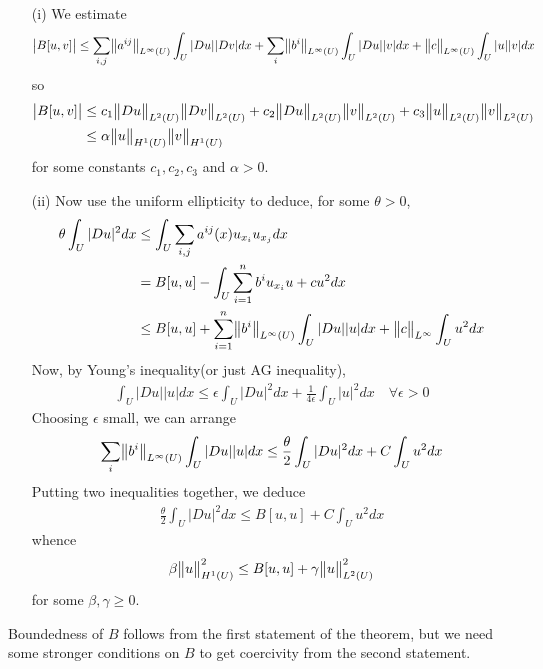 \documentclass[12pt,a4paper]{report}
\newenvironment{proof}
{\begin{changemargin}{1cm}{0.5cm} 
	}%
	{\end{changemargin}
}
\begin{document}
\begin{proof}
\pf \begin{itemize}
\item[(i)] We estimate
\begin{align*}
\big| B[u,v]\big| \leq \sum_{i,j} \bigl\lVert a^{ij}\bigr\rVert_{L^{\infty}(U)} \int_U |Du||Dv| dx + \sum_{i} \bigl\lVert b^i\bigr\rVert_{L^{\infty}(U)} \int_U |Du||v| dx + \bigl\lVert c\bigr\rVert_{L^{\infty}(U)} \int_U |u||v| dx
\end{align*}
so
\begin{align*}
\big| B[u,v]\big| &\leq c_1 \bigl\lVert Du\bigr\rVert_{L^2(U)} \bigl\lVert Dv\bigr\rVert_{L^2(U)} + c_2 \bigl\lVert Du\bigr\rVert_{L^2(U)} \bigl\lVert v\bigr\rVert_{L^2(U)} + c_3 \bigl\lVert u\bigr\rVert_{L^2(U)} \bigl\lVert v\bigr\rVert_{L^2(U)} \\
&\leq \alpha \bigl\lVert u\bigr\rVert_{H^1(U)} \bigl\lVert v\bigr\rVert_{H^1(U)}
\end{align*}
for some constants $c_1,c_2,c_3$ and $\alpha>0$.
\item[(ii)] Now use the uniform ellipticity to deduce, for some $\theta >0$,
\begin{align*}
\theta \int_U |Du|^2 dx &\leq \int_U \sum_{i,j} a^{ij}(x) u_{x_i} u_{x_j} dx \\
&= B[u,u] - \int_U \sum_{i=1}^n b^i u_{x_i} u + cu^2 dx \\
&\leq B[u,u] + \sum_{i=1}^n \bigl\lVert b^i\bigr\rVert_{L^{\infty}(U)} \int_U |Du||u| dx + \bigl\lVert c\bigr\rVert_{L^{\infty}} \int_U u^2 dx
\end{align*}
Now, by Young's inequality(or just AG inequality),
\begin{align*}
\int_U |Du||u| dx \leq \epsilon \int_U |Du|^2 dx + \frac{1}{4\epsilon} \int_U |u|^2 dx \quad \forall \epsilon>0
\end{align*}
Choosing $\epsilon$ small, we can arrange
\begin{align*}
\sum_i \bigl\lVert b^i\bigr\rVert_{L^{\infty}(U)} \int_U |Du||u| dx \leq \frac{\theta}{2} \int_U |Du|^2 dx + C \int_U u^2 dx
\end{align*}
Putting two inequalities together, we deduce
\begin{align*}
\frac{\theta}{2} \int_U |Du|^2 dx \leq B[u,u] + C \int_U u^2 dx
\end{align*}
whence
\begin{align*}
\beta \bigl\lVert u\bigr\rVert_{H^1(U)}^2 \leq B[u,u] + \gamma \bigl\lVert u\bigr\rVert_{L^2(U)}^2
\end{align*}
for some $\beta, \gamma\geq 0$.
\end{itemize}

\eop
\end{proof}
\s

Boundedness of $B$ follows from the first statement of the theorem, but we need some stronger conditions on $B$ to get coercivity from the second statement.
\s
\end{document}
